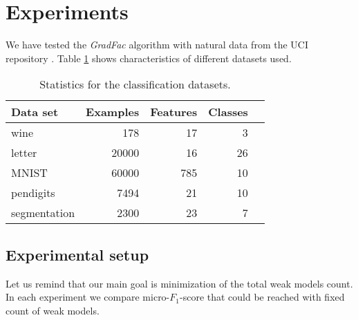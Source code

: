 \documentclass{article}
\begin{document}
\section{Experiments} \label{experiments}
We have tested the \emph{GradFac} algorithm with natural data from the UCI repository \cite{uciRepo}. Table \ref{datasets} shows characteristics of different datasets used.

\begin{table}[t]
\caption{Statistics for the classification datasets.}
\label{datasets}
\vskip 0.15in
\begin{center}
\begin{small}
\begin{sc}
\begin{tabular}{lrrrr}
\hline
\abovespace\belowspace
Data set & Examples & Features & Classes \\
\hline
\abovespace
wine     		& 178 	& 17 	& 3     \\
letter    		& 20000 & 16 	& 26 	\\
MNIST     		& 60000 & 785 	& 10    \\
pendigits 		& 7494 	& 21 	& 10 	\\
segmentation    & 2300 	& 23 	& 7     \\
\hline
\end{tabular}
\end{sc}
\end{small}
\end{center}
\vskip -0.1in
\end{table}


 
\subsection{Experimental setup}
Let us remind that our main goal is minimization of the total weak models count. In each experiment we compare micro-$F_1$-score that could be reached with fixed count of weak models. 
\end{document}
